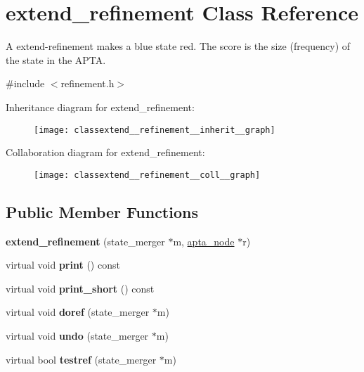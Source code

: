\hypertarget{classextend__refinement}{}\section{extend\+\_\+refinement Class Reference}
\label{classextend__refinement}


A extend-\/refinement makes a blue state red. The score is the size (frequency) of the state in the A\+P\+TA.  




{\ttfamily \#include $<$refinement.\+h$>$}



Inheritance diagram for extend\+\_\+refinement\+:
\nopagebreak
\begin{figure}[H]
\begin{center}
\leavevmode
\texttt{[image: classextend\_\_refinement\_\_inherit\_\_graph]}
\end{center}
\end{figure}


Collaboration diagram for extend\+\_\+refinement\+:
\nopagebreak
\begin{figure}[H]
\begin{center}
\leavevmode
\texttt{[image: classextend\_\_refinement\_\_coll\_\_graph]}
\end{center}
\end{figure}
\subsection*{Public Member Functions}
\begin{DoxyCompactItemize}
\item 
\mbox{\label{classextend__refinement_ac943d5ce03d9cd0ce355e7f80ecd8669}} 
{\bfseries extend\+\_\+refinement} (state\+\_\+merger $\ast$m, \hyperlink{classapta__node}{apta\+\_\+node} $\ast$r)
\item 
\mbox{\label{classextend__refinement_a4b4cb7d57f6d5baea2c3b82afa293c0a}} 
virtual void {\bfseries print} () const
\item 
\mbox{\label{classextend__refinement_ac04afc35f5fdb34cbc8888ed9c1eea4e}} 
virtual void {\bfseries print\+\_\+short} () const
\item 
\mbox{\label{classextend__refinement_abb1a3f9c5ee0d5badace72bee46320d4}} 
virtual void {\bfseries doref} (state\+\_\+merger $\ast$m)
\item 
\mbox{\label{classextend__refinement_a5421f88fc0063f78c8ec6887985f7e5e}} 
virtual void {\bfseries undo} (state\+\_\+merger $\ast$m)
\item 
\mbox{\label{classextend__refinement_a2576d61a6caad766691e7059b0b2c087}} 
virtual bool {\bfseries testref} (state\+\_\+merger $\ast$m)
\end{DoxyCompactItemize}
